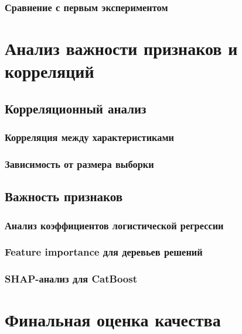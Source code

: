 \documentclass[a4paper,12pt]{report}
\begin{document}
\subsection{Сравнение с первым экспериментом}

\chapter{Анализ важности признаков и корреляций}

\section{Корреляционный анализ}

\subsection{Корреляция между характеристиками}

\subsection{Зависимость от размера выборки}

\section{Важность признаков}

\subsection{Анализ коэффициентов логистической регрессии}

\subsection{Feature importance для деревьев решений}

\subsection{SHAP-анализ для CatBoost}

\chapter{Финальная оценка качества}
\end{document}
